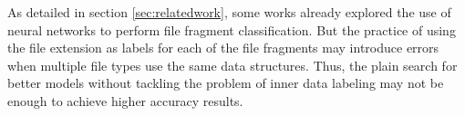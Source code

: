 As detailed in section \ref{sec:relatedwork}, some works already explored the use of neural networks to perform file fragment classification. But the practice of using the file extension as labels for each of the file fragments may introduce errors when multiple file types use the same data structures. Thus, the plain search for better models without tackling the problem of inner data labeling may not be enough to achieve higher accuracy results.
